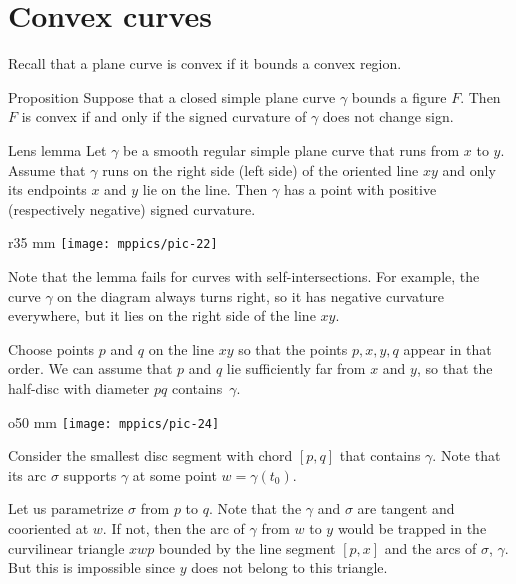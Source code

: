 \section{Convex curves}

Recall that a plane curve is convex if it bounds a convex region.

\begin{thm}{Proposition}\label{prop:convex}
Suppose that a closed simple plane curve $\gamma$ bounds a figure $F$.
Then $F$ is convex if and only if the signed curvature of $\gamma$ does not change sign.
\end{thm}


\begin{thm}{Lens lemma}\label{lem:lens}
Let $\gamma$ be a smooth regular simple plane curve that runs from $x$ to $y$.
Assume that $\gamma$ runs on the right side (left side) of the oriented line $xy$ and only its endpoints $x$ and $y$ lie on the line.
Then $\gamma$ has a point with positive (respectively negative) signed curvature.
\end{thm}

{

\begin{wrapfigure}{r}{35 mm}
\vskip-4mm
\centering
\texttt{[image: mppics/pic-22]}
\vskip0mm
\end{wrapfigure}

Note that the lemma fails for curves with self-intersections.
For example, the curve $\gamma$ on the diagram always turns right, 
so it has negative curvature everywhere, but it lies on the right side of the line $xy$.

}

Choose points $p$ and $q$ on the line $xy$
so that the points $p, x, y, q$ appear in that order.
We can assume that $p$ and $q$ lie sufficiently far from $x$ and $y$, so that the half-disc with diameter $pq$ contains~$\gamma$.

\begin{wrapfigure}[6]{o}{50 mm}
\vskip-3mm
\centering
\texttt{[image: mppics/pic-24]}
\end{wrapfigure}

Consider the smallest disc segment with chord $[p,q]$ that contains $\gamma$.
Note that its arc $\sigma$ supports $\gamma$ at some point $w=\gamma(t_0)$.

Let us parametrize $\sigma$ from $p$ to $q$.
Note that the $\gamma$ and $\sigma$ are tangent and cooriented at $w$.
If not, then the arc of $\gamma$ from $w$ to $y$ would be trapped in the curvilinear triangle $xwp$ bounded by the line segment $[p,x]$ and the arcs of $\sigma$, $\gamma$.
But this is impossible since $y$ does not belong to this triangle.

